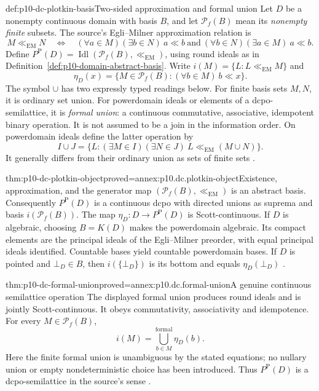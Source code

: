 \begin{hbdefinition}{def:p10-dc-plotkin-basis}{Two-sided approximation and formal union}
Let \(D\) be a nonempty continuous domain with basis \(B\), and let
\(\mathcal P_f(B)\) mean its \emph{nonempty finite} subsets.
The source's Egli--Milner approximation relation is
\[
 M\ll_{\mathrm{EM}}N\quad\Longleftrightarrow\quad
 (\forall a\in M)(\exists b\in N)\ a\ll b
 \ \text{and}\
 (\forall b\in N)(\exists a\in M)\ a\ll b.
\]
Define \(P^{\mathrm P}(D)=
\operatorname{Idl}(\mathcal P_f(B),\ll_{\mathrm{EM}})\), using round
ideals as in Definition~\ref{def:p10-domain-abstract-basis}.
Write \(i(M)=\{L:L\ll_{\mathrm{EM}}M\}\) and
\[
 \eta_D(x)=\{M\in\mathcal P_f(B):(\forall b\in M)\ b\ll x\}.
\]
The symbol \(\cup\) has two expressly typed readings below.
For finite basis sets \(M,N\), it is ordinary set union.
For powerdomain ideals or elements of a dcpo-semilattice, it is
\emph{formal union}: a continuous commutative, associative, idempotent
binary operation. It is not assumed to be a join in the information order.
On powerdomain ideals define the latter operation by
\[
 I\cup J=\{L:(\exists M\in I)(\exists N\in J)\
                         L\ll_{\mathrm{EM}}(M\cup N)\}.
\]
It generally differs from their ordinary union as sets of finite sets
\cite[Definitions~6.2.1--2; Theorem~6.2.3, pp.~93--94]
{AbramskyJungCorrectedExpandedDomainTheory}.
\end{hbdefinition}

\begin{hbtheorem}{thm:p10-dc-plotkin-object}{proved=annex:p10.dc.plotkin-object}{Existence, approximation, and the generator map}
\((\mathcal P_f(B),\ll_{\mathrm{EM}})\) is an abstract basis.
Consequently \(P^{\mathrm P}(D)\) is a continuous dcpo with directed
unions as suprema and basis \(i(\mathcal P_f(B))\).
The map \(\eta_D:D\to P^{\mathrm P}(D)\) is Scott-continuous.
If \(D\) is algebraic, choosing \(B=K(D)\) makes the powerdomain
algebraic. Its compact elements are the principal ideals of the
Egli--Milner preorder, with equal principal ideals identified.
Countable bases yield countable powerdomain bases. If \(D\) is pointed
and \(\bot_D\in B\), then \(i(\{\bot_D\})\) is its bottom and
equals \(\eta_D(\bot_D)\)
\cite[Theorem~6.2.3; pp.~94--95]
{AbramskyJungCorrectedExpandedDomainTheory}.
\end{hbtheorem}

\begin{hbtheorem}{thm:p10-dc-formal-union}{proved=annex:p10.dc.formal-union}{A genuine continuous semilattice operation}
The displayed formal union produces round ideals and is jointly
Scott-continuous. It obeys commutativity, associativity and idempotence.
For every \(M\in\mathcal P_f(B)\),
\[
 i(M)=\mathop{\bigcup}_{b\in M}^{\mathrm{formal}}\eta_D(b).
\]
Here the finite formal union is unambiguous by the stated equations;
no nullary union or empty nondeterministic choice has been introduced.
Thus \(P^{\mathrm P}(D)\) is a dcpo-semilattice in the source's
sense \cite[pp.~93--94]{AbramskyJungCorrectedExpandedDomainTheory}.
\end{hbtheorem}

